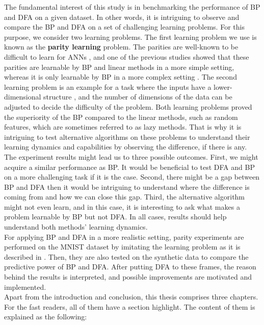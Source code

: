 \documentclass[a4paper, nobind]{templates/ociamthesis}
\begin{document}
The fundamental interest of this study is in benchmarking the performance of BP and DFA on a given dataset. In other words, it is intriguing to observe and compare the BP and DFA on a set of challenging learning problems. For this purpose, we consider two learning problems. The first learning problem we use is known as the \textbf{parity learning} problem. The parities are well-known to be difficult to learn for ANNs \cite{DBLP:journals/corr/abs-1807-06399}, and one of the previous studies showed that these parities are learnable by BP and linear methods in a more simple setting, whereas it is only learnable by BP in a more complex setting \cite{DBLP:journals/corr/abs-2002-07400}. The second learning problem is an example for a task where the inputs have a lower-dimensional structure \cite{chizat2020implicit}, and the number of dimensions of the data can be adjusted to decide the difficulty of the problem. Both learning problems proved the superiority of the BP compared to the linear methods, such as random features, which are sometimes referred to as lazy methods. That is why it is intriguing to test alternative algorithms on these problems to understand their learning dynamics and capabilities by observing the difference, if there is any.\\
The experiment results might lead us to three possible outcomes. First, we might acquire a similar performance as BP. It would be beneficial to test DFA and BP on a more challenging task if it is the case. Second, there might be a gap between BP and DFA then it would be intriguing to understand where the difference is coming from and how we can close this gap. Third, the alternative algorithm might not even learn, and in this case, it is interesting to ask what makes a problem learnable by BP but not DFA. In all cases, results should help understand both methods' learning dynamics.\\
For applying BP and DFA in a more realistic setting, parity experiments are performed on the MNIST dataset by imitating the learning problem as it is described in \cite{DBLP:journals/corr/abs-2002-07400}. Then, they are also tested on the synthetic data to compare the predictive power of BP and DFA. After putting DFA to these frames, the reason behind the results is interpreted, and possible improvements are motivated and implemented.\\
Apart from the introduction and conclusion, this thesis comprises three chapters. For the fast readers, all of them have a section highlight. The content of them is explained as the following:\\
\end{document}
